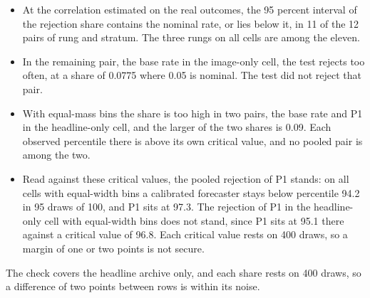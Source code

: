\begin{itemize}
\item At the correlation estimated on the real outcomes, the 95 percent interval of the rejection share contains the nominal rate, or lies below it, in 11 of the 12 pairs of rung and stratum. The three rungs on all cells are among the eleven.
\item In the remaining pair, the base rate in the image-only cell, the test rejects too often, at a share of 0.0775 where 0.05 is nominal. The test did not reject that pair.
\item With equal-mass bins the share is too high in two pairs, the base rate and P1 in the headline-only cell, and the larger of the two shares is 0.09. Each observed percentile there is above its own critical value, and no pooled pair is among the two.
\item Read against these critical values, the pooled rejection of P1 stands: on all cells with equal-width bins a calibrated forecaster stays below percentile 94.2 in 95 draws of 100, and P1 sits at 97.3. The rejection of P1 in the headline-only cell with equal-width bins does not stand, since P1 sits at 95.1 there against a critical value of 96.8. Each critical value rests on 400 draws, so a margin of one or two points is not secure.
\end{itemize}
The check covers the headline archive only, and each share rests on 400 draws, so a difference of two points between rows is within its noise.

